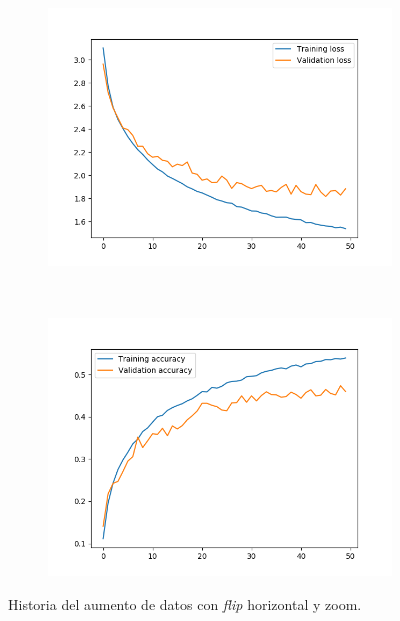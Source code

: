 \documentclass[11pt,a4paper]{article}
\begin{document}
\begin{figure}[H]
  \begin{subfigure}{.5\textwidth}
    \centering
    \includegraphics[scale=0.4]{img/aug-flipzoom-loss.png}
    \label{fig:aug-flipzoom-loss}
  \end{subfigure}%
  ~ \quad
  \begin{subfigure}{.5\textwidth}
    \centering
    \includegraphics[scale=0.4]{img/aug-flipzoom-acc.png}
    \label{fig:aug-flipzoom-acc}
  \end{subfigure}
  \caption{Historia del aumento de datos con \textit{flip} horizontal y zoom.}
  \label{fig:history-aug-flipzoom}
\end{figure}
\end{document}
